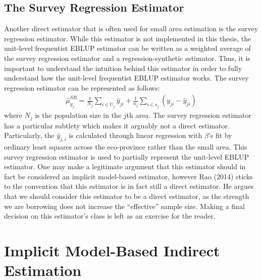 \documentclass[12pt,twoside]{reedthesis}
\begin{document}
\hypertarget{the-survey-regression-estimator}{%
\subsection{The Survey Regression Estimator}\label{the-survey-regression-estimator}}

Another direct estimator that is often used for small area estimation is the survey regression estimator. While this estimator is not implemented in this thesis, the unit-level frequentist EBLUP estimator can be written as a weighted average of the survey regression estimator and a regression-synthetic estimator. Thus, it is important to understand the intuition behind this estimator in order to fully understand how the unit-level frequentist EBLUP estimator works. The survey regression estimator can be represented as follows:
\begin{align}
\hat \mu_{y_j}^{SR} = \frac{1}{N_j} \sum_{i \in U_j} \hat y_{ji} +
\frac{1}{n_j} \sum_{i \in s_j} (y_{ji} - \hat y_{ji})
\end{align}
where \(N_j\) is the population size in the \(j\)th area. The survey regression estimator has a particular subtlety which makes it arguably not a direct estimator. Particularly, the \(\hat y_{j,i}\) is calculated through linear regression with \(\beta\)'s fit by ordinary least squares across the eco-province rather than the small area. This survey regression estimator is used to partially represent the unit-level EBLUP estimator. One may make a legitimate argument that this estimator should in fact be considered an implicit model-based estimator, however Rao (2014) sticks to the convention that this estimator is in fact still a direct estimator. He argues that we should consider this estimator to be a direct estimator, as the strength we are borrowing does not increase the ``effective'' sample size. Making a final decision on this estimator's class is left as an exercise for the reader.

\hypertarget{implicit-model-based-indirect-estimation}{%
\section{Implicit Model-Based Indirect Estimation}\label{implicit-model-based-indirect-estimation}}
\end{document}
